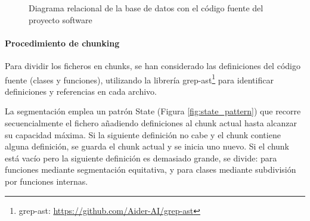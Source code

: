 \begin{figure}[h]
  \centering
  \caption{Diagrama relacional de la base de datos con el código fuente del proyecto software}
  \label{fig:relacional}
\end{figure}

\paragraph{Procedimiento de chunking}
Para dividir los ficheros en chunks, se han considerado las definiciones del código fuente (clases y funciones), utilizando la librería grep-ast\footnote{grep-ast: \url{https://github.com/Aider-AI/grep-ast}} para identificar definiciones y referencias en cada archivo.

La segmentación emplea un patrón State (Figura \ref{fig:state_pattern}) que recorre secuencialmente el fichero añadiendo definiciones al chunk actual hasta alcanzar su capacidad máxima. Si la siguiente definición no cabe y el chunk contiene alguna definición, se guarda el chunk actual y se inicia uno nuevo. Si el chunk está vacío pero la siguiente definición es demasiado grande, se divide: para funciones mediante segmentación equitativa, y para clases mediante subdivisión por funciones internas.

